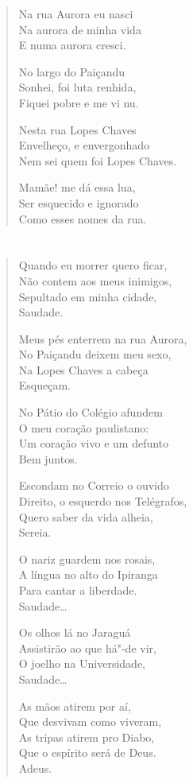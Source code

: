 \begin{verse}
Na rua Aurora eu nasci\\
Na aurora de minha vida\\
E numa aurora cresci.

No largo do Paiçandu\\
Sonhei, foi luta renhida,\\
Fiquei pobre e me vi nu.

Nesta rua Lopes Chaves\\
Envelheço, e envergonhado\\
Nem sei quem foi Lopes Chaves.

Mamãe! me dá essa lua,\\
Ser esquecido e ignorado\\
Como esses nomes da rua.
\end{verse}


\chapter*{}

\begin{verse}
Quando eu morrer quero ficar,\\
Não contem aos meus inimigos,\\
Sepultado em minha cidade,\\
\qquad\qquad Saudade.

Meus pés enterrem na rua Aurora,\\
No Paiçandu deixem meu sexo,\\
Na Lopes Chaves a cabeça\\
\qquad\qquad Esqueçam.

No Pátio do Colégio afundem\\
O meu coração paulistano:\\
Um coração vivo e um defunto\\
\qquad\qquad Bem juntos.

Escondam no Correio o ouvido\\
Direito, o esquerdo nos Telégrafos,\\
Quero saber da vida alheia,\\
\qquad\qquad Sereia.

O nariz guardem nos rosais,\\
A língua no alto do Ipiranga\\
Para cantar a liberdade.\\
\qquad\qquad Saudade\ldots{}

Os olhos lá no Jaraguá\\
Assistirão ao que há"-de vir,\\
O joelho na Universidade,\\
\qquad\qquad Saudade\ldots{}

As mãos atirem por aí,\\
Que desvivam como viveram,\\
As tripas atirem pro Diabo,\\
Que o espírito será de Deus.\\
\qquad\qquad Adeus.
\end{verse}

